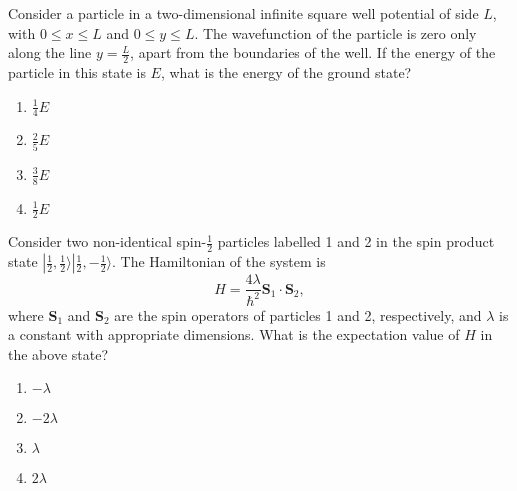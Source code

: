 \item Consider a particle in a two-dimensional infinite square well potential of side $L$, with $0 \leq x \leq L$ and $0 \leq y \leq L$. The wavefunction of the particle is zero only along the line $y = \frac{L}{2}$, apart from the boundaries of the well. If the energy of the particle in this state is $E$, what is the energy of the ground state?
\begin{enumerate}
\item $\frac{1}{4} E$
\item $\frac{2}{5} E$
\item $\frac{3}{8} E$
\item $\frac{1}{2} E$
\end{enumerate}
\item Consider two non-identical spin-$\frac{1}{2}$ particles labelled 1 and 2 in the spin product state $|\frac{1}{2}, \frac{1}{2}\rangle |\frac{1}{2}, -\frac{1}{2}\rangle$. The Hamiltonian of the system is 
\[
H = \frac{4\lambda}{\hbar^2} \mathbf{S}_1 \cdot \mathbf{S}_2,
\]
where $\mathbf{S}_1$ and $\mathbf{S}_2$ are the spin operators of particles 1 and 2, respectively, and $\lambda$ is a constant with appropriate dimensions. What is the expectation value of $H$ in the above state?
\begin{enumerate}
\item $-\lambda$
\item $-2\lambda$
\item $\lambda$
\item $2\lambda$
\end{enumerate}
